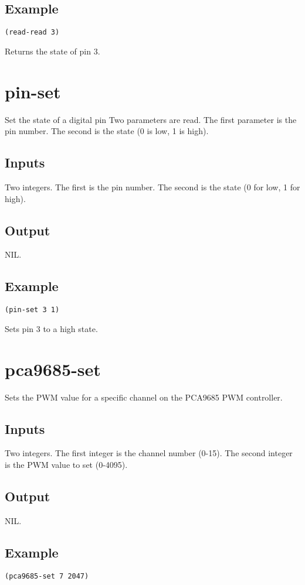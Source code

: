 \documentclass[10pt, openany]{book}
\begin{document}
\subsection{Example}
\begin{lstlisting}
(read-read 3)
\end{lstlisting}
Returns the state of pin 3.

\section{pin-set}
Set the state of a digital pin  Two parameters are read.  The first parameter is the pin number.  The second is the state (0 is low, 1 is high).
\subsection{Inputs}
Two integers.  The first is the pin number.  The second is the state (0 for low, 1 for high).
\subsection{Output}
NIL.
\subsection{Example}
\begin{lstlisting}
(pin-set 3 1)
\end{lstlisting}
Sets pin 3 to a high state.

\section{pca9685-set}
Sets the PWM value for a specific channel on the PCA9685 PWM controller.
\subsection{Inputs}
Two integers.  The first integer is the channel number (0-15).  The second integer is the PWM value to set (0-4095).
\subsection{Output}
NIL.
\subsection{Example}
\begin{lstlisting}
(pca9685-set 7 2047)
\end{lstlisting}
\end{document}
